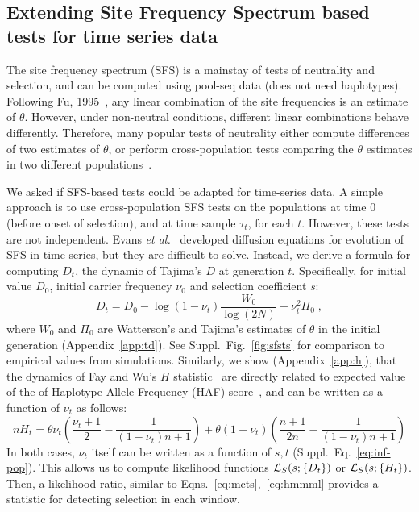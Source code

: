 \subsection{Extending Site Frequency Spectrum  based tests for  time series 
data}\label{sec:extending-sfs}
\label{sec:sfs-ts}
The site frequency spectrum (SFS) is a mainstay of tests of neutrality
and selection, and can be computed using pool-seq data (does not
need haplotypes). Following Fu, 1995~\cite{fu1995statistical}, any
linear combination of the site frequencies is an estimate of
$\theta$. However, under non-neutral conditions, different linear
combinations behave differently. Therefore, many popular tests of
neutrality either compute differences of two estimates of $\theta$, or
perform cross-population tests comparing the $\theta$ estimates in two
different
populations~\cite{achaz2009frequency,ronen2013learning,sabeti2007genome}. 

We asked if SFS-based tests could be adapted for time-series data. A
simple approach is to use cross-population SFS tests on the
populations at time $0$ (before onset of selection), and at time
sample $\tau_t$, for each $t$. However, these tests are not
independent. Evans \emph{et al.}~\cite{evans2007non} developed
diffusion equations for evolution of SFS in time series, but they are
difficult to solve. Instead, we derive a formula for computing $D_t$,
the dynamic of Tajima's $D$ at generation $t$. Specifically, for
initial value $D_0$, initial carrier frequency $\nu_0$ and 
selection coefficient $s$:
\begin{equation}
  D_t=D_0-\log(1-\nu_t) \frac{W_0}{\log(2N)} -\nu_t^2 \Pi_0\;,
  \label{eq:tdt}    
\end{equation}
where $W_0$ and $\Pi_0$ are Watterson's and Tajima's estimates of
$\theta$ in the initial generation (Appendix~\ref{app:td}).  See
Suppl.~Fig.~\ref{fig:sfsts} for comparison to empirical values from
simulations. Similarly, we show (Appendix~\ref{app:h}), that the
dynamics of Fay and Wu's $H$ statistic~\cite{fay2000hitchhiking} are
directly related to expected value of the of Haplotype Allele
Frequency (HAF) score~\cite{ronen2015predicting}, and can be written
as a function of $\nu_t$ as follows:
\begin{equation}
  nH_t= \theta \nu_t \left(\frac{\nu_t+1}{2} -
    \frac{1}{(1-\nu_t)n+1}\right) + \theta
  (1-\nu_t)\left(\frac{n+1}{2n}-\frac{1}{(1-\nu_t)n+1}\right)
  \label{eq:ht}
\end{equation}	
In both cases, $\nu_t$ itself can be written as a function of $s,t$
(Suppl.~Eq.~\ref{eq:inf-pop}). This allows us to compute likelihood
functions ${\cal L}_S(s; \{D_t\})$ or ${\cal L}_S(s; \{H_t\})$. Then, a
likelihood ratio, similar to Eqns.~\ref{eq:mcts},~\ref{eq:hmmml}
provides a statistic for detecting selection in each window.

